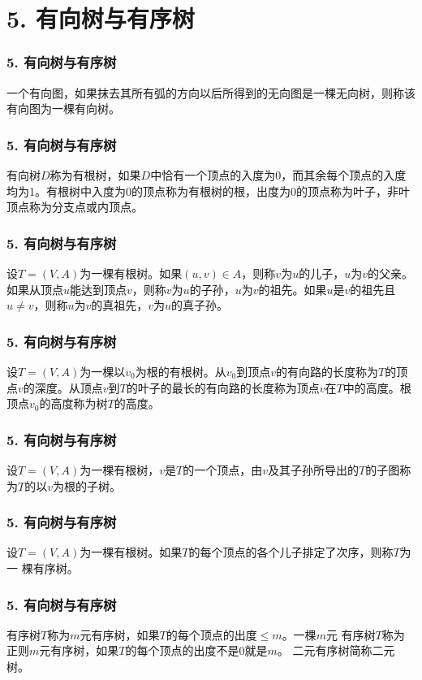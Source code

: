 \section{5. 有向树与有序树}
\begin{frame}
  \frametitle{5. 有向树与有序树}
  \begin{Def}
    一个有向图，如果抹去其所有弧的方向以后所得到的无向图是一棵无向树，则称该有向图为一棵\alert{有向树}。
  \end{Def}
\end{frame}
\begin{frame}
  \frametitle{5. 有向树与有序树}
  \begin{Def}
    有向树$D$称为\alert{有根树}，如果$D$中恰有一个顶点的入度为0，而其余每个顶点的入度均为1。有根树中入度为0的顶点称为有根树的根，出度为0的顶点称为\alert{叶子}，非叶顶点称为\alert{分支点}或\alert{内顶点}。
  \end{Def}
\end{frame}

\begin{frame}
  \frametitle{5. 有向树与有序树}
  \begin{Def}
  设$T=(V,A)$为一棵有根树。如果$(u,v)\in A$，则称$v$为$u$的\alert{儿子}，$u$为$v$的\alert{父亲}。如果从顶点$u$能达到顶点$v$，则称$v$为$u$的\alert{子孙}，$u$为$v$的\alert{祖先}。如果$u$是$v$的祖先且$u \neq v$，则称$u$为$v$的\alert{真祖先}，$v$为$u$的\alert{真子孙}。
  \end{Def}
\end{frame}

\begin{frame}
  \frametitle{5. 有向树与有序树}
  \begin{Def}\justifying\let\raggedright\justifying
    设$T=(V,A)$为一棵以$v_0$为根的有根树。从$v_0$到顶点$v$的有向路的长度称为$T$的顶点$v$的\alert{深度}。从顶点$v$到$T$的叶子的最长的有向路的长度称为顶点$v$在$T$中的\alert{高度}。根顶点$v_0$的高度称为树$T$的\alert{高度}。
  \end{Def}
\end{frame}

\begin{frame}
  \frametitle{5. 有向树与有序树}
  \begin{Def}
    设$T=(V,A)$为一棵有根树，$v$是$T$的一个顶点，由$v$及其子孙所导出的$T$的子图称为$T$的以$v$为根的\alert{子树}。
  \end{Def}
\end{frame}

\begin{frame}
  \frametitle{5. 有向树与有序树}
  \begin{Def}
    设$T=(V,A)$为一棵有根树。如果$T$的每个顶点的各个儿子排定了次序，则称$T$为一
    棵\alert{有序树}。
  \end{Def}
\end{frame}

\begin{frame}
  \frametitle{5. 有向树与有序树}
  \begin{Def}
    有序树$T$称为\alert{$m$元有序树}，如果$T$的每个顶点的出度$\leq m$。一棵$m$元
    有序树$T$称为\alert{正则$m$元有序树}，如果$T$的每个顶点的出度不是$0$就是$m$。
    二元有序树简称\alert{二元树}。
  \end{Def}
\end{frame}

